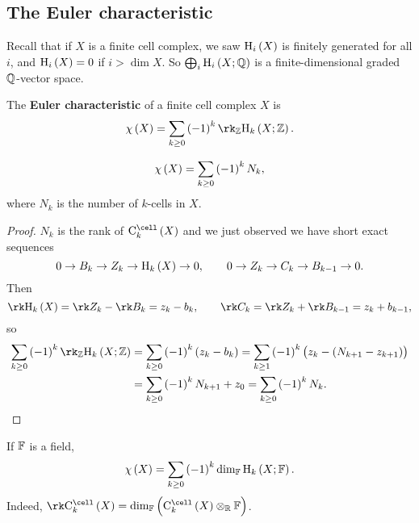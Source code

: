 \subsection{The Euler characteristic}

Recall that if $ X $ is a finite cell complex, we saw $ \H_i\br{X} $ is finitely generated for all $ i $, and $ \H_i\br{X} = 0 $ if $ i > \dim X $. So $ \bigoplus_i \H_i\br{X; \QQ} $ is a finite-dimensional graded $ \mathbb{Q} $-vector space.

\begin{definition*}
The \textbf{Euler characteristic} of a finite cell complex $ X $ is
$$ \chi\br{X} = \sum_{k \ge 0} \br{-1}^k\rk_\ZZ \H_k\br{X; \ZZ}. $$
\end{definition*}

\begin{lemma}
$$ \chi\br{X} = \sum_{k \ge 0} \br{-1}^kN_k, $$
where $ N_k $ is the number of $ k $-cells in $ X $.
\end{lemma}

\begin{proof}
$ N_k $ is the rank of $ \C_k^{\cell}\br{X} $ and we just observed we have short exact sequences
$$ 0 \to B_k \to Z_k \to \H_k\br{X} \to 0, \qquad 0 \to Z_k \to C_k \to B_{k - 1} \to 0. $$
Then
$$ \rk \H_k\br{X} = \rk Z_k - \rk B_k = z_k - b_k, \qquad \rk C_k = \rk Z_k + \rk B_{k - 1} = z_k + b_{k - 1}, $$
so
\begin{align*}
\sum_{k \ge 0} \br{-1}^k\rk_\ZZ \H_k\br{X; \ZZ}
& = \sum_{k \ge 0} \br{-1}^k\br{z_k - b_k}
= \sum_{k \ge 1} \br{-1}^k\br{z_k - \br{N_{k + 1} - z_{k + 1}}} \\
& = \sum_{k \ge 0} \br{-1}^kN_{k + 1} + z_0
= \sum_{k \ge 0} \br{-1}^kN_k.
\end{align*}
\end{proof}

\begin{remark*}
If $ \mathbb{F} $ is a field,
$$ \chi\br{X} = \sum_{k \ge 0} \br{-1}^k\dim_\FF \H_k\br{X; \FF}. $$
Indeed, $ \rk \C_k^{\cell}\br{X} = \dim_\FF \br{\C_k^{\cell}\br{X} \otimes_\RR \FF} $.
\end{remark*}

